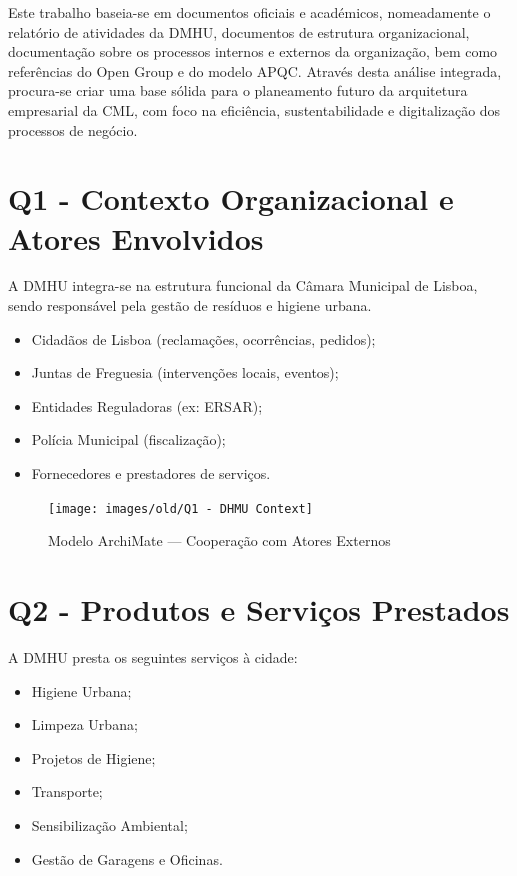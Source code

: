 \documentclass[12pt,a4paper,final]{article}
\begin{document}
    Este trabalho baseia-se em documentos oficiais e académicos, nomeadamente o relatório de atividades da DMHU, documentos de estrutura organizacional, documentação sobre os processos internos e externos da organização, bem como referências do Open Group e do modelo APQC. Através desta análise integrada, procura-se criar uma base sólida para o planeamento futuro da arquitetura empresarial da CML, com foco na eficiência, sustentabilidade e digitalização dos processos de negócio.


    \section*{Q1 - Contexto Organizacional e Atores Envolvidos}\label{sec:contexto-organizacional-e-atores-envolvidos}
    A DMHU integra-se na estrutura funcional da Câmara Municipal de Lisboa, sendo responsável pela gestão de resíduos e higiene urbana.
    \begin{itemize}
        \item Cidadãos de Lisboa (reclamações, ocorrências, pedidos);
        \item Juntas de Freguesia (intervenções locais, eventos);
        \item Entidades Reguladoras (ex: ERSAR);
        \item Polícia Municipal (fiscalização);
        \item Fornecedores e prestadores de serviços.
    \end{itemize}

    \begin{figure}[H]
        \centering
        \texttt{[image: images/old/Q1 - DHMU Context]}
        \caption{Modelo ArchiMate — Cooperação com Atores Externos}
        \label{fig:1}
    \end{figure}

    \section*{Q2 - Produtos e Serviços Prestados}\label{sec:produtos-e-servicos-prestados}
    A DMHU presta os seguintes serviços à cidade:
    \begin{itemize}
        \item Higiene Urbana;
        \item Limpeza Urbana;
        \item Projetos de Higiene;
        \item Transporte;
        \item Sensibilização Ambiental;
        \item Gestão de Garagens e Oficinas.
    \end{itemize}
\end{document}
